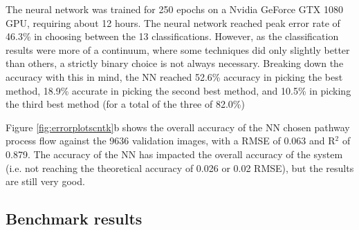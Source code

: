 \documentclass[final,3p,times,authoryear]{elsarticle}
\begin{document}
The neural network was trained for 250 epochs on a Nvidia GeForce GTX 1080 GPU, requiring about 12 hours. The neural network reached peak error rate of 46.3\% in choosing between the 13 classifications. However, as the classification results were more of a continuum, where some techniques did only slightly better than others, a strictly binary choice is not always necessary. Breaking down the accuracy with this in mind, the NN reached 52.6\% accuracy in picking the best method, 18.9\% accurate in picking the second best method, and 10.5\% in picking the third best method (for a total of the three of 82.0\%)

Figure \ref{fig:errorplotscntk}b shows the overall accuracy of the NN chosen pathway process flow against the 9636 validation images, with a RMSE of 0.063 and R$^{2}$ of 0.879. The accuracy of the NN has impacted the overall accuracy of the system (i.e. not reaching the theoretical accuracy of 0.026 or 0.02 RMSE), but the results are still very good. 













\subsection{Benchmark results}
\end{document}
